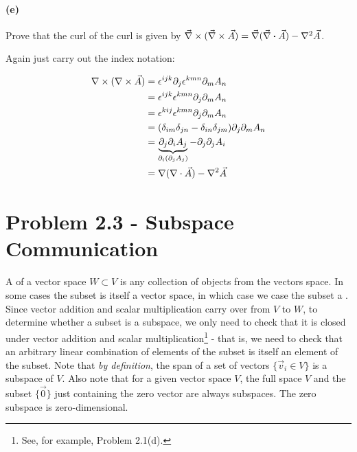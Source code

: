 \documentclass{article}
\begin{document}
\paragraph{(e)}
Prove that the curl of the curl is given by $\vec{\nabla}\times(\vec{\nabla}\times\vec{A}) = \vec{\nabla}(\vec{\nabla}\boldsymbol{\cdot}\vec{A}) - \nabla^{2}\vec{A}$.

\begin{solution}
    Again just carry out the index notation:

    \begin{align*}
        \nabla \times(\nabla \times \vec A) &= \epsilon^{ijk}\partial_j \epsilon^{kmn} \partial_m A_n\\
        &= \epsilon^{ijk}\epsilon^{kmn} \partial_j \partial_m A_n\\
        &= \epsilon^{kij}\epsilon^{kmn} \partial_j \partial_m A_n \\
        &= (\delta_{im}\delta_{jn} - \delta_{in}\delta_{jm}) \partial_j \partial_m A_n\\
        &= \underbrace{\partial_j \partial_i A_j}_{\partial_i(\partial_j A_j)} - \partial_j \partial_j A_i\\
        &= \nabla(\nabla \cdot \vec A) - \nabla^2 \vec A
    \end{align*}
\end{solution}

\pagebreak
\section*{Problem 2.3 - Subspace Communication}


\paragraph{}
A  of a vector space $W\subset V$ is any collection of objects from the vectors space.  In some cases the subset is itself a vector space, in which case we case the subset a
.  Since vector addition and scalar multiplication carry over from $V$ to $W$, to determine whether a subset is a subspace, we only need to check that it is 
closed under vector addition and scalar multiplication\footnote{See, for example, Problem 2.1(d).} - that is, we need to check that an arbitrary linear combination of elements of the subset is itself an 
element of the subset.  Note that \emph{by definition}, the span of a set of vectors $\{\vec{v}_{i}\in V\}$ is a subspace of $V$.  Also note that for a given vector space $V$, the full space 
$V$ and the subset $\{\vec{0}\}$ just containing the zero vector are always subspaces.  The zero subspace is zero-dimensional.
\end{document}
